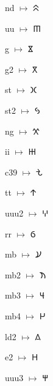{\noindent nd $\mapsto$ {\cafont 𐊾}\par
\noindent uu $\mapsto$ {\cafont 𐊿}\par
\noindent g $\mapsto$ {\cafont 𐋀}\par
\noindent g2 $\mapsto$ {\cafont 𐋁}\par
\noindent st $\mapsto$ {\cafont 𐋂}\par
\noindent st2 $\mapsto$ {\cafont 𐋃}\par
\noindent ng $\mapsto$ {\cafont 𐋄}\par
\noindent ii $\mapsto$ {\cafont 𐋅}\par
\noindent c39 $\mapsto$ {\cafont 𐋆}\par
\noindent tt $\mapsto$ {\cafont 𐋇}\par
\noindent uuu2 $\mapsto$ {\cafont 𐋈}\par
\noindent rr $\mapsto$ {\cafont 𐋉}\par
\noindent mb $\mapsto$ {\cafont 𐋊}\par
\noindent mb2 $\mapsto$ {\cafont 𐋋}\par
\noindent mb3 $\mapsto$ {\cafont 𐋌}\par
\noindent mb4 $\mapsto$ {\cafont 𐋍}\par
\noindent ld2 $\mapsto$ {\cafont 𐋎}\par
\noindent e2 $\mapsto$ {\cafont 𐋏}\par
\noindent uuu3 $\mapsto$ {\cafont 𐋐}\par
}

